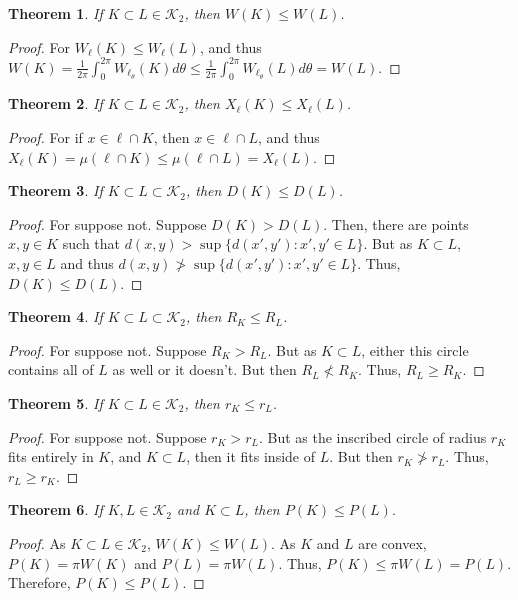 \documentclass[oneside]{book}
\theoremstyle{mystyle}
\newtheorem{theorem}{Theorem}[section]
\begin{document}
\begin{theorem}
If $K\subset L\in \mathscr{K}_2$, then $W(K)\leq W(L)$.
\end{theorem}
\begin{proof}
For $W_{\ell}(K)\leq W_{\ell}(L)$, and thus $W(K)=\frac{1}{2\pi}\int_{0}^{2\pi}W_{\ell_{\theta}}(K)d\theta \leq \frac{1}{2\pi}\int_{0}^{2\pi}W_{\ell_{\theta}}(L)d\theta=W(L)$.
\end{proof}

\begin{theorem}
If $K\subset L\in \mathscr{K}_2$, then $X_{\ell}(K)\leq X_{\ell}(L)$.
\end{theorem}
\begin{proof}
For if $x\in \ell\cap K$, then $x\in \ell\cap L$, and thus $X_{\ell}(K)=\mu(\ell\cap K) \leq \mu(\ell\cap L)=X_{\ell}(L)$.
\end{proof}

\begin{theorem}
If $K\subset L\subset \mathscr{K}_2$, then $D(K)\leq D(L)$.
\end{theorem}
\begin{proof}
For suppose not. Suppose $D(K)>D(L)$. Then, there are points $x,y\in K$ such that $d(x,y)> \sup\{d(x',y'):x',y'\in L\}$. But as $K\subset L$, $x,y\in L$ and thus $d(x,y) \not> \sup\{d(x',y'):x',y'\in L\}$. Thus, $D(K)\leq D(L)$.
\end{proof}

\begin{theorem}
If $K\subset L \subset \mathscr{K}_2$, then $R_K\leq R_L$.
\end{theorem}
\begin{proof}
For suppose not. Suppose $R_K>R_L$. But as $K\subset L$, either this circle contains all of $L$ as well or it doesn't. But then $R_L \not<R_K$. Thus, $R_L\geq R_K$.
\end{proof}

\begin{theorem}
If $K\subset L \in \mathscr{K}_2$, then $r_K \leq r_L$.
\end{theorem}
\begin{proof}
For suppose not. Suppose $r_K> r_L$. But as the inscribed circle of radius $r_K$ fits entirely in $K$, and $K\subset L$, then it fits inside of $L$. But then $r_K \not > r_L$. Thus, $r_L \geq r_K$.
\end{proof}

\begin{theorem}
If $K,L\in \mathscr{K}_2$ and $K\subset L$, then $P(K)\leq P(L)$.
\end{theorem}
\begin{proof}
As $K\subset L\in  \mathscr{K}_2$, $W(K)\leq W(L)$. As $K$ and $L$ are convex, $P(K)=\pi W(K)$ and $P(L)=\pi W(L)$. Thus, $P(K) \leq \pi W(L) = P(L)$. Therefore, $P(K)\leq P(L)$.
\end{proof}
\end{document}
